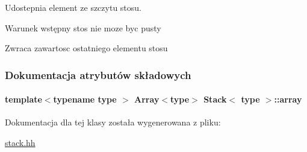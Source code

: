Udostepnia element ze szczytu stosu. 

\begin{DoxyPrecond}{Warunek wstępny}
stos nie moze byc pusty 
\end{DoxyPrecond}
\begin{DoxyReturn}{Zwraca}
zawartosc ostatniego elementu stosu 
\end{DoxyReturn}


\subsubsection{Dokumentacja atrybutów składowych}
\hypertarget{class_stack_ae391f10eeb7e30406357caf95b0f2534}{
\paragraph[{array}]{\setlength{\rightskip}{0pt plus 5cm}template$<$typename type $>$ {\bf Array}$<$type$>$ {\bf Stack}$<$ type $>$\-::array\hspace{0.3cm}{\ttfamily [private]}}}\label{class_stack_ae391f10eeb7e30406357caf95b0f2534}


Dokumentacja dla tej klasy została wygenerowana z pliku\-:\begin{DoxyCompactItemize}
\item 
\hyperlink{stack_8hh}{stack.\-hh}\end{DoxyCompactItemize}
